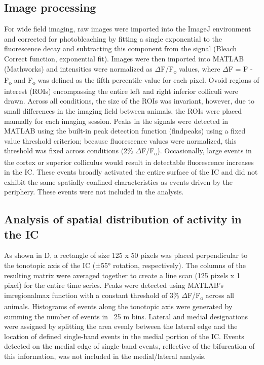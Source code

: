 \documentclass[9pt,lineno]{elife}
\begin{document}
\subsection{Image processing}
For wide field imaging, raw images were imported into the ImageJ environment and corrected for photobleaching by fitting a single exponential to the fluorescence decay and subtracting this component from the signal (Bleach Correct function, exponential fit). Images were then imported into MATLAB (Mathworks) and intensities were normalized as $ \Delta $F/F\textsubscript{o} values, where $ \Delta $F = F - F\textsubscript{o}  and F\textsubscript{o} was defined as the fifth percentile value for each pixel. Ovoid regions of interest (ROIs) encompassing the entire left and right inferior colliculi were drawn. Across all conditions, the size of the ROIs was invariant, however, due to small differences in the imaging field between animals, the ROIs were placed manually for each imaging session. Peaks in the signals were detected in MATLAB using the built-in peak detection function (findpeaks) using a fixed value threshold criterion; because fluorescence values were normalized, this threshold was fixed across conditions (2\% $ \Delta $F/F\textsubscript{o}). Occasionally, large events in the cortex or superior colliculus would result in detectable fluorescence increases in the IC. These events broadly activated the entire surface of the IC and did not exhibit the same spatially-confined characteristics as events driven by the periphery. These events were not included in the analysis. 

\subsection{Analysis of spatial distribution of activity in the IC}
As shown in D, a rectangle of size 125 x 50 pixels was placed perpendicular to the tonotopic axis of the IC (±55° rotation, respectively). The columns of the resulting matrix were averaged together to create a line scan (125 pixels x 1 pixel) for the entire time series. Peaks were detected using MATLAB’s imregionalmax function with a constant threshold of 3\% $ \Delta $F/F\textsubscript{o} across all animals. Histograms of events along the tonotopic axis were generated by summing the number of events in ~25 \textmu m bins. Lateral and medial designations were assigned by splitting the area evenly between the lateral edge and the location of defined single-band events in the medial portion of the IC. Events detected on the medial edge of single-band events, reflective of the bifurcation of this information, was not included in the medial/lateral analysis.
\end{document}
